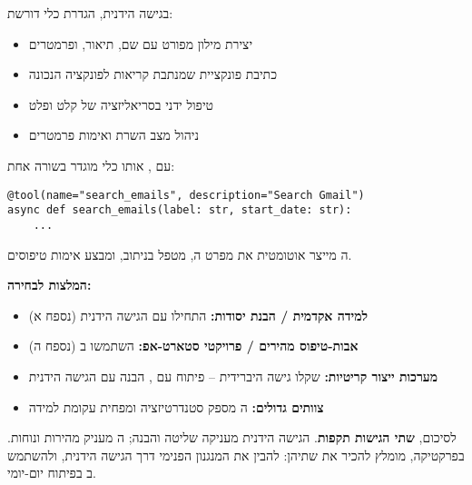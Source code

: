 בגישה הידנית, הגדרת כלי דורשת:
\begin{itemize}
\item יצירת מילון  מפורט עם שם, תיאור, ופרמטרים
\item כתיבת פונקציית  שמנתבת קריאות לפונקציה הנכונה
\item טיפול ידני בסריאליזציה של קלט ופלט
\item ניהול מצב השרת ואימות פרמטרים
\end{itemize}

עם , אותו כלי מוגדר בשורה אחת:
\begin{english}
\begin{verbatim}
@tool(name="search_emails", description="Search Gmail")
async def search_emails(label: str, start_date: str):
    ...
\end{verbatim}
\end{english}

ה מייצר אוטומטית את מפרט ה, מטפל בניתוב, ומבצע אימות טיפוסים.

\textbf{המלצות לבחירה:}
\begin{itemize}
\item \textbf{למידה אקדמית / הבנת יסודות:} התחילו עם הגישה הידנית (נספח א)
\item \textbf{אבות-טיפוס מהירים / פרויקטי סטארט-אפ:} השתמשו ב (נספח ה)
\item \textbf{מערכות ייצור קריטיות:} שקלו גישה היברידית – פיתוח עם , הבנה עם הגישה הידנית
\item \textbf{צוותים גדולים:} ה מספק סטנדרטיזציה ומפחית עקומת למידה
\end{itemize}

לסיכום, \textbf{שתי הגישות תקפות}. הגישה הידנית מעניקה שליטה והבנה; ה מעניק מהירות ונוחות. בפרקטיקה, מומלץ להכיר את שתיהן: להבין את המנגנון הפנימי דרך הגישה הידנית, ולהשתמש ב בפיתוח יום-יומי.

